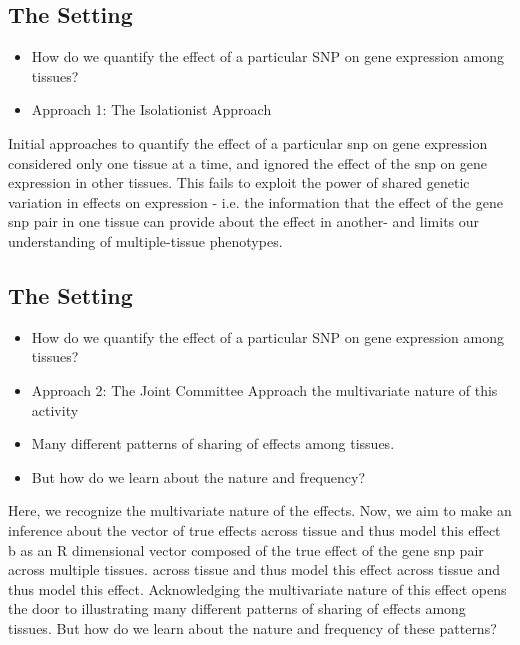 \documentclass[10pt,letterpaper]{article}
\begin{document}
\subsection{The Setting}
\begin{itemize}
\item{How do we quantify the effect of a particular SNP on gene expression among tissues?}
\item{Approach 1: The Isolationist Approach}
\end{itemize}
%
Initial approaches to quantify the effect of a particular snp on gene expression considered only one tissue at a time, and ignored the effect of the snp on gene expression in other tissues. This fails to  exploit the power of  shared genetic variation in effects on expression - i.e. the information that the effect of the gene snp pair in one tissue can provide about the effect in another- and limits our understanding of multiple-tissue phenotypes. 



\subsection{The Setting}
\begin{itemize}
\item{How do we quantify the effect of a particular SNP on gene expression among tissues?}
\item{Approach 2: The Joint Committee Approach}
\itemRecognize the multivariate nature of this activity
\item Many different patterns of sharing of effects among tissues.
\item But how do we learn about the nature and frequency?
\end{itemize}

Here, we recognize the multivariate nature of the effects. Now, we aim to make an inference about the vector of  true effects across tissue and thus model this effect b as an R dimensional vector composed of the true effect of the gene snp pair across multiple tissues. across tissue and thus model this effect across tissue and thus model this effect. Acknowledging the multivariate nature of this effect opens the door to illustrating many different patterns of sharing of effects among tissues. But how do we learn about the nature and frequency of these patterns?
\end{document}
